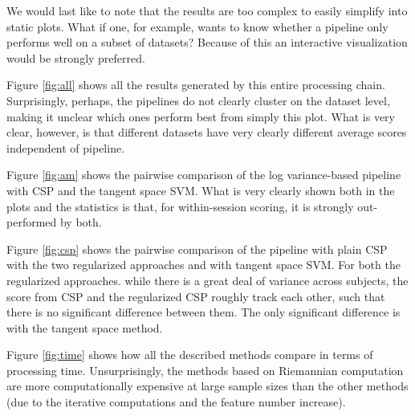 We would last like to note that the results are too complex to easily
simplify into static plots. What if one, for example, wants to know
whether a pipeline only performs well on a subset of datasets? Because
of this an interactive visualization would be strongly preferred.

Figure \ref{fig:all} shows all the results generated by this entire
processing chain. Surprisingly, perhaps, the pipelines do not clearly
cluster on the dataset level, making it unclear which ones perform
best from simply this plot. What is very clear, however, is that
different datasets have very clearly different average scores
independent of pipeline.

Figure \ref{fig:am} shows the pairwise comparison of the log
variance-based pipeline with CSP and the tangent space SVM. What is
very clearly shown both in the plots and the statistics is that, for
within-session scoring, it is strongly out-performed by both.

Figure \ref{fig:csp} shows the pairwise comparison of the
pipeline with plain CSP with the two regularized approaches and with
tangent space SVM. For both the regularized approaches. while there is
a great deal of variance across subjects, the score from CSP and the
regularized CSP roughly track each other, such that there is no
significant difference between them. The only significant difference
is with the tangent space method.

Figure \ref{fig:time} shows how all the described methods compare in
terms of processing time. Unsurprisingly, the methods based on
Riemannian computation are more computationally expensive at large
sample sizes than the other methods (due to the iterative computations
and the feature number increase). 

